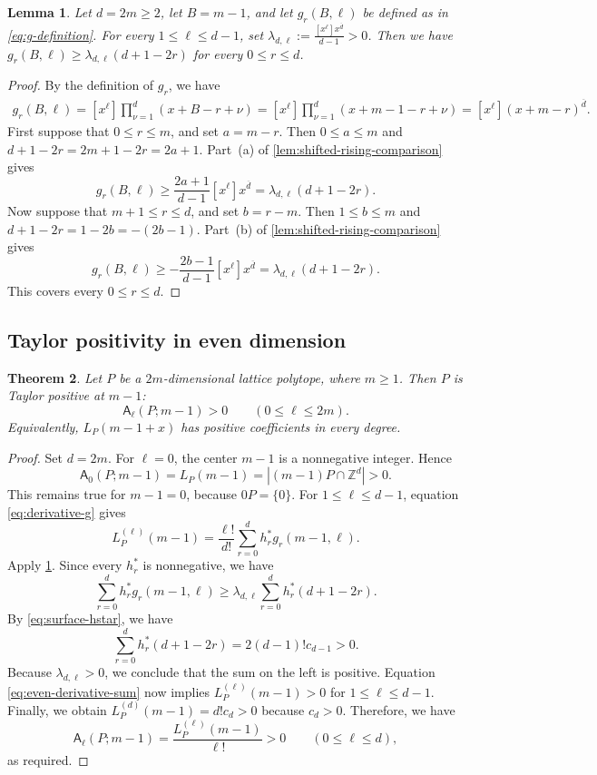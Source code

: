 \documentclass[reqno, 12pt]{article}
\numberwithin{equation}{section}
\newtheorem{theorem}{Theorem}[section]
\newtheorem{lemma}[theorem]{Lemma}
\theoremstyle{definition}
\newcommand{\Z}{\mathbb{Z}}
\newcommand{\A}{\mathsf{A}}
\begin{document}
\begin{lemma}\label{lem:even-comparison}
Let $d=2m\geq2$, let $B=m-1$, and let $g_r(B,\ell)$ be defined as in
\eqref{eq:g-definition}.  For every $1\leq\ell\leq d-1$, set
$\lambda_{d,\ell}:=\frac{[x^\ell]x^{\overline d}}{d-1}>0$.
Then we have $g_r(B,\ell)\geq\lambda_{d,\ell}(d+1-2r)$ for every $0\leq r\leq d$.
\end{lemma}
\begin{proof}
By the definition of $g_r$, we have 
\begin{align*}
g_r(B,\ell)=[x^\ell]\prod_{\nu=1}^{d}(x+B-r+\nu)=[x^\ell]\prod_{\nu=1}^{d}(x+m-1-r+\nu)=[x^\ell](x+m-r)^{\overline d}.
\end{align*}
First suppose that $0\leq r\leq m$, and set $a=m-r$.  Then
$0\leq a\leq m$ and $d+1-2r=2m+1-2r=2a+1$.
Part~(a) of \cref{lem:shifted-rising-comparison} gives
\[g_r(B,\ell)\geq\frac{2a+1}{d-1}[x^\ell]x^{\overline d}=\lambda_{d,\ell}(d+1-2r).
\]
Now suppose that $m+1\leq r\leq d$, and set $b=r-m$.  Then
$1\leq b\leq m$ and $d+1-2r=1-2b=-(2b-1)$.
Part~(b) of \cref{lem:shifted-rising-comparison} gives
\[g_r(B,\ell)\geq-\frac{2b-1}{d-1}[x^\ell]x^{\overline d}=\lambda_{d,\ell}(d+1-2r).
\]
This covers every $0\leq r\leq d$.
\end{proof}

\subsection{Taylor positivity in even dimension}

\begin{theorem}\label{thm:even-dimensional-optimal-upper}
Let $P$ be a $2m$-dimensional lattice polytope, where $m\geq1$.  Then $P$ is Taylor positive at $m-1$:
\[
 \A_\ell(P;m-1)>0\qquad(0\leq\ell\leq2m).
\]
Equivalently, $L_P(m-1+x)$ has positive coefficients in every degree.
\end{theorem}
\begin{proof}
Set $d=2m$.
For $\ell=0$, the center $m-1$ is a nonnegative integer.  Hence
\[\A_0(P;m-1)=L_P(m-1)=|(m-1)P\cap\Z^d|>0.
\]
This remains true for $m-1=0$, because $0P=\{0\}$.
For $1\leq\ell\leq d-1$, equation \eqref{eq:derivative-g} gives
\begin{equation}\label{eq:even-derivative-sum}
 L_P^{(\ell)}(m-1)=\frac{\ell!}{d!}\sum_{r=0}^{d}h_r^*g_r(m-1,\ell).
\end{equation}
Apply \cref{lem:even-comparison}.  Since every $h_r^*$ is nonnegative, we have 
\[\sum_{r=0}^{d}h_r^*g_r(m-1,\ell)\geq\lambda_{d,\ell}\sum_{r=0}^{d}h_r^*(d+1-2r).
\]
By \eqref{eq:surface-hstar}, we have
\[\sum_{r=0}^{d}h_r^*(d+1-2r)=2(d-1)!c_{d-1}>0.
\]
Because $\lambda_{d,\ell}>0$, we conclude that the sum on the left is positive.  Equation \eqref{eq:even-derivative-sum} now implies
$L_P^{(\ell)}(m-1)>0$ for $1\leq\ell\leq d-1$. Finally, we obtain $L_P^{(d)}(m-1)=d!c_d>0$ because $c_d>0$. 
Therefore, we have 
\[\A_\ell(P;m-1)=\frac{L_P^{(\ell)}(m-1)}{\ell!}>0\qquad(0\leq\ell\leq d),
\]
as required.
\end{proof}
\end{document}
